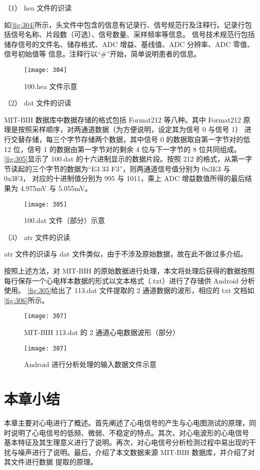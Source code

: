 （1）	hea 文件的识读 

如\autoref{fig:304}所示，头文件中包含的信息有记录行、信号规范行及注释行。记录行包括信号名称、片段数（可选）、信号数量、采样频率等信息。
信号技术规范行包括储存信号的文件名、储存格式、ADC 增益、基线值、ADC 分辨率、ADC 零值、信号初始值等
信息。注释行以“\#”开始，简单说明患者的信息。 
\begin{figure}[htbp]
    \centering
    \texttt{[image: 304]}
    \caption{\label{fig:304}100.hea 文件示意}
\end{figure}

（2）	dat 文件的识读 

MIT-BIH 数据库中数据存储的格式包括 Format212 等八种。其中 Format212 原理是按照采样顺序，对两通道数据（为方便说明，设定其为信号 0 与信号 1）
进行交替存储，每三个字节存储两个数据，其中信号 0 的数据取自第一字节对的低 12 位，信号 1 的数据由第一字节对的剩余 4 位与下一字节的 8 位共同组成。
\autoref{fig:305}显示了 100.dat 的十六进制显示的数据片段。按照 212 的格式，从第一字节读起的三个字节的数据为“E3 33 F3”，则两通道信号值分别为 0x3E3 与 0x3F3，
对应的十进制值分别为 995 与 1011，乘上 ADC 增益数值所得的最后结果为 4.975mV 与 5.055mV。 
\begin{figure}[htbp]
    \centering
    \texttt{[image: 305]}
    \caption{\label{fig:305}100.dat 文件（部分）示意 }
\end{figure}

（3）	atr 文件的识读 

atr 文件的识读与 dat 文件类似，由于不涉及原始数据，故在此不做过多介绍。 

按照上述方法，对 MIT-BIH 的原始数据进行处理，本文将处理后获得的数据按照每行保存一个心电样本数据的形式以文本格式（.txt）进行了存储供 Android 分析使用。
\autoref{fig:305}给出了 113.dat 文件提取的 2 通道数据的波形，相应的 txt 文档如\autoref{fig:306}所示。 

\begin{figure}[htbp]
    \centering
    \texttt{[image: 307]}
    \caption{\label{fig:306}MIT-BIH 113.dat 的 2 通道心电数据波形（部分）}
\end{figure}

\begin{figure}[htbp]
    \centering
    \texttt{[image: 307]}
    \caption{\label{fig:307}Android 进行分析处理的输入数据文件示意}
\end{figure}

\section{本章小结}
本章主要对心电进行了概述。首先阐述了心电信号的产生与心电图测试的原理，同时说明了心电信号的低频、微弱、不稳定的特点。其次，对心电波形的心电信号
基本特征及其生理意义进行了说明。再次，对心电信号分析检测过程中易出现的干扰与噪声进行了说明。最后，介绍了本文数据来源 MIT-BIH 数据库，并介绍了对其文件进行数据
提取的原理。 
